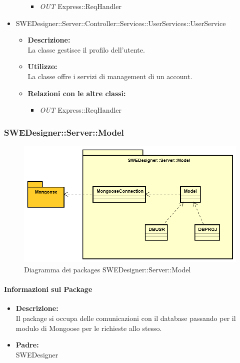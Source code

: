 \begin{itemize}
\begin{itemize}
				\begin{itemize}
					\item \emph{OUT} Express::ReqHandler
				\end{itemize}
			\end{itemize}
			\item SWEDesigner::Server::Controller::Services::UserServices::UserService
			\begin{itemize}
				\item \textbf{Descrizione: }\\
				La classe gestisce il profilo dell'utente.
				\item \textbf{Utilizzo: }\\
				La classe offre i servizi di management di un account.
				\item \textbf{Relazioni con le altre classi: }
				\begin{itemize}
					\item \emph{OUT} Express::ReqHandler
				\end{itemize}
			\end{itemize}
		\end{itemize}

		\subsubsection{SWEDesigner::Server::Model}
		 \begin{figure}[h!]
		\centering
		\includegraphics[scale=0.4]{Disegnetti/SWEDesigner__Server__Model.png}
		\caption{Diagramma dei packages SWEDesigner::Server::Model}
 		\end{figure}
		\paragraph{Informazioni sul Package}
		\begin{itemize}
			\item \textbf{Descrizione: }\\
			Il package si occupa delle comunicazioni con il database passando per il modulo di Mongoose per le richieste allo stesso.
			\item \textbf{Padre: }\\ SWEDesigner
		\end{itemize}

